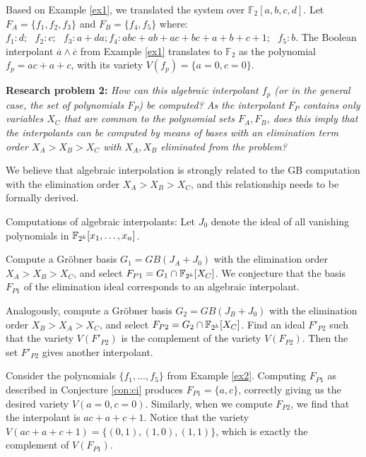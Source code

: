 \begin{Example} \label{ex2}
Based on Example \ref{ex1}, we translated the system over
$\mathbb{F}_2[a, b, c, d]$. Let $F_A = \{f_1, f_2, f_3\}$ and $F_B =
\{f_4, f_5\}$ where: $f_1: d; ~~~f_2: c; ~~~f_3: a + da; f_4:  abc +
ab + ac + bc + a + b + c + 1; ~~~f_5: b.$ The Boolean interpolant
$\overline{a}\wedge\overline{c}$ from Example \ref{ex1} translates to
${\mathbb{F}}_2$ as the polynomial $f_p = ac + a + c$, with its
variety $V(f_p) = \{a=0, c=0\}$.   
\end{Example}

{\bf Research problem 2:}
{\it How can this algebraic interpolant $f_p$ (or in the general case,
  the set of polynomials $F_P$) be computed? As the interpolant $F_P$ 
contains only variables $X_C$ that are common to the polynomial sets
$F_A, F_B$, does this imply that the interpolants can be computed by
means of \Grobner bases with an elimination term order $X_A>X_B>X_C$
with $X_A, X_B$ eliminated from the problem? }

We believe that algebraic interpolation is strongly related
to the GB computation with the elimination order $X_A>X_B>X_C$, and
this relationship needs to be formally derived. 

\begin{Conjecture} \label{con:ci}
Computations of algebraic interpolants: Let $J_0$ denote the ideal of
all vanishing polynomials in ${\mathbb{F}}_{2^k}[x_1,\dots,x_n]$.
\bi
\item  Compute a Gr\"obner basis $G_1 = GB(J_A + J_0)$ 
with the elimination order $X_A > X_B > X_C$, and select
$F_{P1}=G_1\cap{\mathbb{F}}_{2^k}[X_C]$. We conjecture that the \Grobner
basis $F_{P1}$ of the elimination ideal corresponds to an algebraic
interpolant. 

\item Analogously, compute a Gr\"obner basis $G_2 = GB(J_B + J_0)$ 
with the elimination order $X_B > X_A > X_C$, and select
$F_{P2}=G_2\cap{\mathbb{F}}_{2^k}[X_C]$. Find an ideal $F'_{P2}$ such that
the variety $V(F'_{P2})$ is the complement of the variety
$V(F_{P2})$. Then the set $F'_{P2}$ gives another interpolant.
\ei
\end{Conjecture}


\begin{Example}\label{ex3}
Consider the polynomials $\{f_1, \dots,f_5\}$ from Example
\ref{ex2}. Computing $F_{P1}$ as described in Conjecture \ref{con:ci} 
produces $F_{P1} = \{a, c\}$, correctly giving us the desired variety
$V(a = 0, c = 0)$. Similarly, when we compute $F_{P2}$, we find that
the interpolant is $ac + a + c + 1$. Notice that the variety 
$V(ac+a+c+1)=\{(0,1), (1,0), (1,1)\}$, which is exactly the complement
of $V(F_{P1})$.  
\end{Example}

